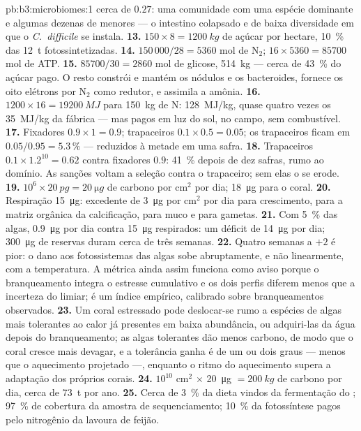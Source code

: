 \begin{solution}{pb:b3:microbiomes:1}
cerca de $0.27$: uma comunidade com uma espécie dominante e algumas
dezenas de menores --- o intestino colapsado e de baixa diversidade em
que o \emph{C.~difficile} se instala.
\textbf{13.} $150\times 8 = \qty{1200}{kg}$ de açúcar por hectare,
\qty{10}{\%} das \qty{12}{t} fotossintetizadas.
\textbf{14.} $150\,000/28 = 5360$ mol de N$_{2}$; $16\times 5360 =
\num{85700}$ mol de ATP.
\textbf{15.} $\num{85700}/30 = 2860$ mol de glicose, \qty{514}{kg} ---
cerca de \qty{43}{\%} do açúcar pago. O resto constrói e mantém os
nódulos e os bacteroides, fornece os oito elétrons por N$_{2}$ como
redutor, e assimila a amônia.
\textbf{16.} $1200\times 16 = \qty{19200}{MJ}$ para \qty{150}{kg} de N:
\qty{128}{MJ/kg}, quase quatro vezes os \qty{35}{MJ/kg} da fábrica ---
mas pagos em luz do sol, no campo, sem combustível.
\textbf{17.} Fixadores $0.9\times 1 = 0.9$; trapaceiros $0.1\times 0.5 =
0.05$; os trapaceiros ficam em $0.05/0.95 = 5.3\,\%$ --- reduzidos à
metade em uma safra.
\textbf{18.} Trapaceiros $0.1\times 1.2^{10} = 0.62$ contra fixadores
$0.9$: \qty{41}{\%} depois de dez safras, rumo ao domínio. As sanções
voltam a seleção contra o trapaceiro; sem elas o  se erode.
\textbf{19.} $10^{6}\times \qty{20}{pg} = \qty{20}{\micro g}$ de carbono
por cm$^{2}$ por dia; \qty{18}{\micro g} para o coral.
\textbf{20.} Respiração \qty{15}{\micro g}: excedente de
\qty{3}{\micro g} por cm$^{2}$ por dia para crescimento, para a matriz
orgânica da calcificação, para muco e para gametas.
\textbf{21.} Com \qty{5}{\%} das algas, \qty{0.9}{\micro g} por dia
contra \qty{15}{\micro g} respirados: um déficit de \qty{14}{\micro g}
por dia; \qty{300}{\micro g} de reservas duram cerca de três semanas.
\textbf{22.} Quatro semanas a $+2$ é pior: o dano aos fotossistemas das
algas sobe abruptamente, e não linearmente, com a temperatura. A
métrica ainda assim funciona como aviso porque o branqueamento integra
o estresse cumulativo e os dois perfis diferem menos que a incerteza do
limiar; é um índice empírico, calibrado sobre branqueamentos
observados.
\textbf{23.} Um coral estressado pode deslocar-se rumo a espécies de
algas mais tolerantes ao calor já presentes em baixa abundância, ou
adquiri-las da água depois do branqueamento; as algas tolerantes dão
menos carbono, de modo que o coral cresce mais devagar, e a tolerância
ganha é de um ou dois graus --- menos que o aquecimento projetado ---,
enquanto o ritmo do aquecimento supera a adaptação dos próprios corais.
\textbf{24.} $10^{10}$ cm$^{2}$ $\times$ \qty{20}{\micro g} $=
\qty{200}{kg}$ de carbono por dia, cerca de \qty{73}{t} por ano.
\textbf{25.} Cerca de \qty{3}{\%} da dieta vindos da fermentação do
; \qty{97}{\%} de cobertura da amostra de sequenciamento;
\qty{10}{\%} da fotossíntese pagos pelo nitrogênio da lavoura de
feijão.
\end{solution}
